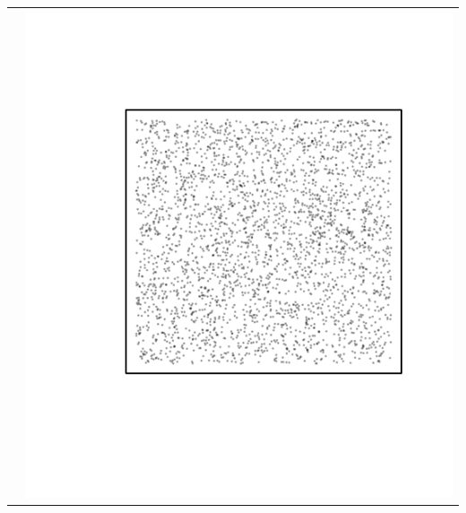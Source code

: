 \documentclass{article}\usepackage{graphicx, color}
\makeatletter
\def\maxwidth{ %
  \ifdim\Gin@nat@width>\linewidth
    \linewidth
  \else
    \Gin@nat@width
  \fi
}
\newenvironment{knitrout}{}{} %
\makeatother
\begin{document}
\begin{tabular}{cc}
&
\begin{knitrout}
\definecolor{shadecolor}{rgb}{0.969, 0.969, 0.969}\color{fgcolor}\includegraphics[width=\maxwidth]{figure/unnamed-chunk-6} 
\end{knitrout}

\\
\end{tabular}
\end{document}
